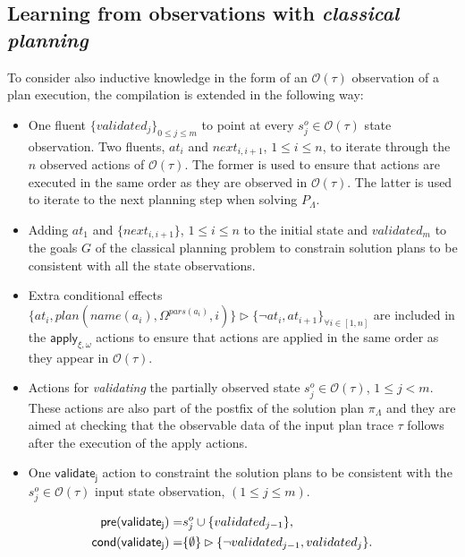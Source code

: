 \documentclass{article}
\newcommand{\pre}{\mathsf{pre}}     %
\newcommand{\cond}{\mathsf{cond}}   %
\begin{document}
\subsection{Learning from observations with {\em classical planning}}
To consider also inductive knowledge in the form of an $\mathcal{O}(\tau)$ observation of a plan execution, the compilation is extended in the following way:
\begin{itemize}
\item One fluent $\{validated_j\}_{0\leq j\leq m}$ to point at every $s_j^o\in\mathcal{O}(\tau)$ state observation. Two fluents, $at_i$ and $next_{i,i+1}$, {\small $1\leq i \leq n$}, to iterate through the $n$ observed actions of $\mathcal{O}(\tau)$. The former is used to ensure that actions are executed in the same order as they are observed in $\mathcal{O}(\tau)$. The latter is used to iterate to the next planning step when solving $P_{\Lambda}$.
\item Adding $at_1$ and $\{next_{i,i+1}\}$, {\small $1\leq i \leq n$} to the initial state and $validated_m$ to the goals $G$ of the classical planning problem to constrain solution plans to be consistent with all the state observations.
\item Extra conditional effects $\{at_{i},plan(name(a_i),\Omega^{pars(a_i)},i)\}\rhd\{\neg at_{i},at_{i+1}\}_{\forall i\in [1,n]}$ are included in the $\mathsf{apply_{\xi,\omega}}$ actions to ensure that actions are applied in the same order as they appear in $\mathcal{O}(\tau)$.
\item Actions for {\em validating} the partially observed state $s_j^o\in\mathcal{O}(\tau)$, {\tt\small $1\leq j< m$}. These actions are also part of the postfix of the solution plan $\pi_\Lambda$ and they are aimed at checking that the observable data of the input plan trace $\tau$ follows after the execution of the apply actions.
\item One $\mathsf{validate_{j}}$ action to constraint the solution plans to be consistent with the $s_j^o\in\mathcal{O}(\tau)$ input state observation, {\small $(1\leq j\leq m)$}.  
\end{itemize}
\begin{small}
\begin{align*}
\hspace*{7pt}\pre(\mathsf{validate_{j}})=&s_j^o\cup\{validated_{j-1}\},\\
\cond(\mathsf{validate_{j}})=&\{\emptyset\}\rhd\{\neg validated_{j-1}, validated_j\}.
\end{align*}
\end{small}
\end{document}
